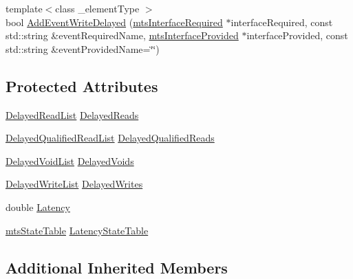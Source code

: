 \begin{DoxyCompactItemize}
\item 
{\footnotesize template$<$class \-\_\-element\-Type $>$ }\\bool \hyperlink{classmts_component_add_latency_a49448643a64f9fe5572df35852df3846}{Add\-Event\-Write\-Delayed} (\hyperlink{classmts_interface_required}{mts\-Interface\-Required} $\ast$interface\-Required, const std\-::string \&event\-Required\-Name, \hyperlink{classmts_interface_provided}{mts\-Interface\-Provided} $\ast$interface\-Provided, const std\-::string \&event\-Provided\-Name=\char`\"{}\char`\"{})
\end{DoxyCompactItemize}
\subsection*{Protected Attributes}
\begin{DoxyCompactItemize}
\item 
\hyperlink{classmts_component_add_latency_a527c29b91f407598cb31a8113d453610}{Delayed\-Read\-List} \hyperlink{classmts_component_add_latency_afca7e020994bba8b9672a34d1a75c5e6}{Delayed\-Reads}
\item 
\hyperlink{classmts_component_add_latency_a00e005acc3d0af37d43abee413e92d1e}{Delayed\-Qualified\-Read\-List} \hyperlink{classmts_component_add_latency_aba7fcf1beb1dfda8f5bc34b3e6c0d3c5}{Delayed\-Qualified\-Reads}
\item 
\hyperlink{classmts_component_add_latency_a693394372f8f73601e8f46ab5a5a1780}{Delayed\-Void\-List} \hyperlink{classmts_component_add_latency_a68571be7ff2288ac2e8ecd534c521eec}{Delayed\-Voids}
\item 
\hyperlink{classmts_component_add_latency_a050cbf3819eb668c8098a78257e22236}{Delayed\-Write\-List} \hyperlink{classmts_component_add_latency_af9d25ccc41677dbf2b56070c803467bd}{Delayed\-Writes}
\item 
double \hyperlink{classmts_component_add_latency_a39ff64ef2a5151a991f7173613136747}{Latency}
\item 
\hyperlink{classmts_state_table}{mts\-State\-Table} \hyperlink{classmts_component_add_latency_a41d4fcc2b22bd8bb53b2a99159f7b667}{Latency\-State\-Table}
\end{DoxyCompactItemize}
\subsection*{Additional Inherited Members}


